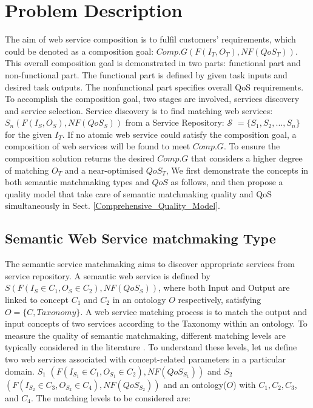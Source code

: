 \documentclass{llncs}
\begin{document}
\section{Problem Description}\label{problemDes}

The aim of web service composition is to fulfil customers' requirements, which could be denoted as a composition goal: $Comp.G(F(I_{T}, O_{T}), NF(QoS_{T}))$. This overall composition goal is demonstrated in two parts: functional part and non-functional part. The functional part is defined by given task inputs and desired task outputs. The nonfunctional part specifies overall QoS requirements. To accomplish the composition goal, two stages are involved, services discovery and service selection. Service discovery is to find matching web services: $S_{n}(F(I_{S}, O_{S}), NF(QoS_{S}))$ from a Service Repository: $\mathcal{S}$ $=  \{S_{1}, S_{2},..., S_{n} \}$ for the given $I_{T}$. If no atomic web service could satisfy the composition goal, a composition of web services will be found to meet $Comp.G$. To ensure the composition solution returns the desired $Comp.G$ that considers a higher degree of matching $O_{T}$ and a near-optimised $QoS_{T}$, We first demonstrate the concepts in both semantic matchmaking types and $QoS$ as follows, and then propose a quality model that take care of semantic matchmaking quality and QoS simultaneously in Sect. \ref{Comprehensive_Quality_Model}.


\subsection{Semantic Web Service matchmaking Type}\label{semantic Web service Discovery}
The semantic service matchmaking aims to discover appropriate services from service repository. A semantic web service is defined by $S(F(I_{S}\in C_{1}, O_{S}\in C_{2}), NF(QoS_{S}))$, where both Input and Output are linked to concept $C_{1}$ and $C_{2}$ in an ontology $O$ respectively, satisfying $O=\{C, Taxonomy\}$. A web service matching process is to match the output and input concepts of two services according to the Taxonomy within an ontology. To measure the quality of semantic matchmaking, different matching levels are typically considered in the literature \cite{paolucci2002semantic}. To understand these levels, let us define two web services associated with concept-related parameters in a particular domain. $S_{1}$ $(F(I_{S_1}\in C_{1}, O_{S_1}\in C_{2}), NF(QoS_{S_1}))$ and  $S_{2}$ $(F(I_{S_2}\in C_{3}, O_{S_2}\in C_{4}), NF(QoS_{S_2}))$ and an ontology($O$) with $C_{1},C_{2},C_{3}$, and $C_{4}$. The matching levels to be considered are:
\end{document}
